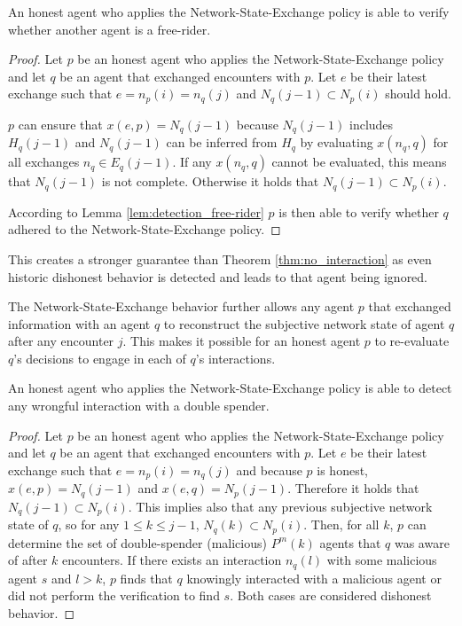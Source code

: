 \begin{thm}
    \label{thm:detectability_free-rider}
    An honest agent who applies the Network-State-Exchange policy is able to verify whether another
    agent is a free-rider.
\end{thm}
\begin{proof}
    Let $p$ be an honest agent who applies the Network-State-Exchange policy and let $q$ be an agent
    that exchanged encounters with $p$. Let $e$ be their latest exchange such that $e = n_p(i) = n_q(j)$
    and $N_q(j-1) \subset N_p(i)$ should hold.
    
    $p$ can ensure that $x(e, p) = N_q(j-1)$ because $N_q(j-1)$ includes $H_q(j-1)$ and $N_q(j-1)$
    can be inferred from $H_q$ by evaluating $x(n_q, q)$ for all exchanges $n_q \in E_q(j-1)$.
    If any $x(n_q, q)$ cannot be evaluated, this means that $N_q(j-1)$ is not complete.
    Otherwise it holds that $N_q(j-1) \subset N_p(i)$. 

    According to Lemma \ref{lem:detection_free-rider} $p$ is then able to verify whether 
    $q$ adhered to the Network-State-Exchange policy.
\end{proof}

This creates a stronger guarantee than Theorem \ref{thm:no_interaction} as even historic dishonest
behavior is detected and leads to that agent being ignored.

The Network-State-Exchange behavior further allows any agent $p$ that exchanged information with an agent $q$
to reconstruct the subjective network state of agent $q$ after any encounter $j$. 
This makes it possible for an honest agent $p$ to re-evaluate $q$'s decisions to engage in each of $q$'s 
interactions.

\begin{thm}
    \label{thm:ver_free-rider}
    An honest agent who applies the Network-State-Exchange policy is able to detect any wrongful
    interaction with a double spender.
\end{thm}
\begin{proof}
    Let $p$ be an honest agent who applies the Network-State-Exchange policy and let $q$ be an agent
    that exchanged encounters with $p$. Let $e$ be their latest exchange such that $e = n_p(i) = n_q(j)$
    and because $p$ is honest, $x(e, p) = N_q(j-1)$ and $x(e,q) = N_p(j-1)$. 
    Therefore it holds that $N_q(j-1) \subset N_p(i)$. This implies also that any previous 
    subjective network state of $q$, so for any $1 \leq k \leq j-1$, $N_q(k) \subset N_p(i)$. Then,
    for all $k$, $p$ can determine the set of double-spender (malicious) $P^m(k)$ agents that $q$
    was aware of after $k$ encounters. If there exists an interaction $n_q(l)$ with some malicious
    agent $s$ and $l>k$, $p$ finds that $q$ knowingly interacted with a malicious agent or did not
    perform the verification to find $s$. Both cases are considered dishonest behavior.
\end{proof}

